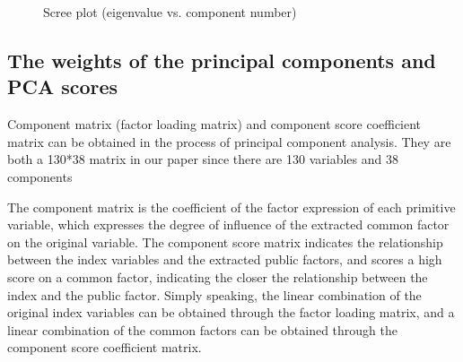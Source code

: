 \documentclass[review,3p,times,12pt,number]{elsarticle}
\begin{document}
\begin{figure}[htbp]
\centering
\caption{Scree plot (eigenvalue vs. component number)}
\label{weibo:fig:scree plot}
\end{figure}

\subsection{The weights of the principal components and PCA scores}
Component matrix (factor loading matrix) and component score coefficient matrix can be obtained in the process of principal component analysis.
They are both a 130*38 matrix in our paper since there are 130 variables and 38 components

The component matrix is the coefficient of the factor expression of each primitive variable, which expresses the degree of influence of the extracted common factor on the original variable. The component score matrix indicates the relationship between the index variables and the extracted public factors, and scores a high score on a common factor, indicating the closer the relationship between the index and the public factor. Simply speaking, the linear combination of the original index variables can be obtained through the factor loading matrix, and a linear combination of the common factors can be obtained through the component score coefficient matrix.
\end{document}
